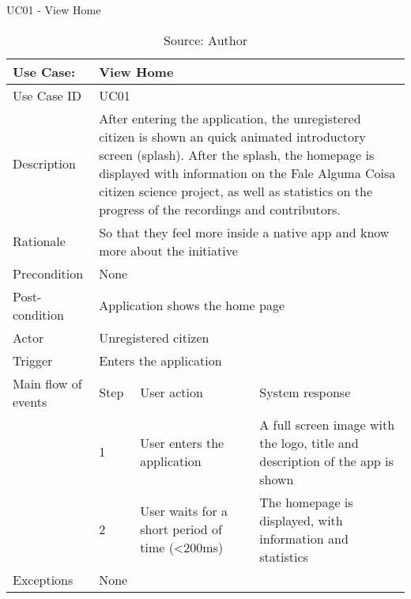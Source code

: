 \begin{table}[h]
\centering
\caption{UC01 - View Home}
\label{uc:01}
\begin{tabular}{|p{3cm}|p{1cm}|p{5cm}|p{5cm}|}
\hline
Use Case:       & \multicolumn{3}{p{11cm}|}{View Home} \\ \hline
Use Case ID     & \multicolumn{3}{p{11cm}|}{UC01} \\ \hline
Description     & \multicolumn{3}{p{11cm}|}{After entering the application, the unregistered citizen is shown an quick animated introductory screen (splash). After the splash, the homepage is displayed with information on the Fale Alguma Coisa citizen science project, as well as statistics on the progress of the recordings and contributors.} \\ \hline
Rationale       & \multicolumn{3}{p{11cm}|}{So that they feel more inside a native app and know more about the initiative} \\ \hline
Precondition    & \multicolumn{3}{p{11cm}|}{None} \\ \hline
Post-condition  & \multicolumn{3}{p{11cm}|}{Application shows the home page} \\ \hline
Actor           & \multicolumn{3}{p{11cm}|}{Unregistered citizen} \\ \hline
Trigger         & \multicolumn{3}{p{11cm}|}{Enters the application} \\ \hline
Main flow of events & Step  & User action & System response \\ \hline
                    & 1     & User enters the application & A full screen image with the logo, title and description of the app is shown \\ \hline
                    & 2     & User waits for a short period of time (<200ms) & The homepage is displayed, with information and statistics \\ \hline
Exceptions      & \multicolumn{3}{p{11cm}|}{None} \\ \hline
\end{tabular}
\caption*{Source: Author}
\end{table}

